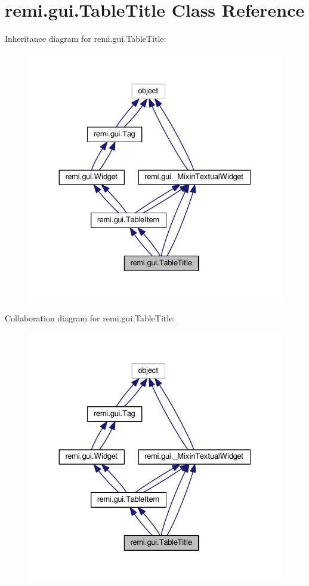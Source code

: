\hypertarget{classremi_1_1gui_1_1TableTitle}{}\section{remi.\+gui.\+Table\+Title Class Reference}
\label{classremi_1_1gui_1_1TableTitle}


Inheritance diagram for remi.\+gui.\+Table\+Title\+:
\nopagebreak
\begin{figure}[H]
\begin{center}
\leavevmode
\includegraphics[width=330pt]{d2/d0d/classremi_1_1gui_1_1TableTitle__inherit__graph}
\end{center}
\end{figure}


Collaboration diagram for remi.\+gui.\+Table\+Title\+:
\nopagebreak
\begin{figure}[H]
\begin{center}
\leavevmode
\includegraphics[width=330pt]{db/dfc/classremi_1_1gui_1_1TableTitle__coll__graph}
\end{center}
\end{figure}
